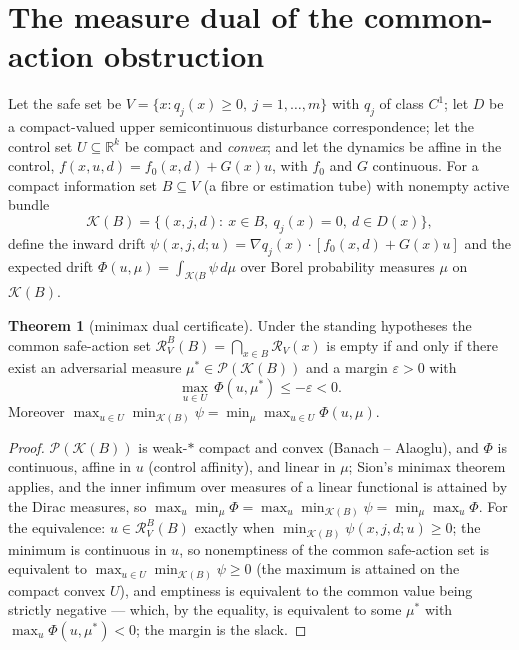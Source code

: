 \documentclass[10pt,twocolumn]{article}
\theoremstyle{definition}
\newtheorem{theorem}{Theorem}
\begin{document}
\section{The measure dual of the common-action obstruction}

Let the safe set be $V = \{x: q_{j}(x) \ge 0,\ j = 1,\dots,m\}$ with
$q_{j}$ of class $C^{1}$; let $D$ be a compact-valued upper
semicontinuous disturbance correspondence; let the control set
$U \subseteq \mathbb{R}^{k}$ be compact and \emph{convex}; and let the
dynamics be affine in the control,
$f(x,u,d) = f_{0}(x,d) + G(x)u$, with $f_{0}$ and $G$ continuous. For a
compact information set $B \subseteq V$ (a fibre or estimation tube) with
nonempty active bundle
\[
\mathcal{K}(B) = \{(x,j,d):\ x \in B,\ q_{j}(x) = 0,\ d \in D(x)\},
\]
define the inward drift
$\psi(x,j,d;u) = \nabla q_{j}(x)\cdot[f_{0}(x,d) + G(x)u]$ and the
expected drift $\Phi(u,\mu) = \int_{\mathcal{K}(B} \psi \,d\mu$ over
Borel probability measures $\mu$ on $\mathcal{K}(B)$.

\begin{theorem}[minimax dual certificate]\label{thm:dual}
Under the standing hypotheses the common safe-action set
$\mathcal{R}^{B}_{V}(B) = \bigcap_{x \in B}\mathcal{R}_{V}(x)$ is empty if
and only if there exist an adversarial measure
$\mu^{*} \in \mathscr{P}(\mathcal{K}(B))$ and a margin $\varepsilon > 0$
with
\begin{equation*}
\max_{u \in U}\,\Phi(u,\mu^{*}) \le -\varepsilon < 0.
\tag{$\star$}
\end{equation*}
Moreover
$\max_{u \in U}\min_{\mathcal{K}(B)}\psi
 = \min_{\mu}\max_{u \in U}\Phi(u,\mu)$.
\end{theorem}
\begin{proof}
$\mathscr{P}(\mathcal{K}(B))$ is weak-$*$ compact and convex (Banach --
Alaoglu), and $\Phi$ is continuous, affine in $u$ (control affinity), and
linear in $\mu$; Sion's minimax theorem applies, and the inner infimum
over measures of a linear functional is attained by the Dirac measures,
so
$\max_{u}\min_{\mu}\Phi = \max_{u}\min_{\mathcal{K}(B)}\psi
 = \min_{\mu}\max_{u}\Phi$.
For the equivalence: $u \in \mathcal{R}^{B}_{V}(B)$ exactly when
$\min_{\mathcal{K}(B)}\psi(x,j,d;u) \ge 0$; the minimum is continuous in
$u$, so nonemptiness of the common safe-action set is equivalent to
$\max_{u \in U}\min_{\mathcal{K}(B)}\psi \ge 0$ (the maximum is attained
on the compact convex $U$), and emptiness is equivalent to the common
value being strictly negative --- which, by the equality, is equivalent to
some $\mu^{*}$ with $\max_{u}\Phi(u,\mu^{*}) < 0$; the margin is the
slack.
\end{proof}
\end{document}
